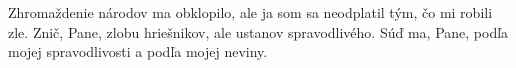 Zhromaždenie národov ma obklopilo, ale ja som sa neodplatil tým, čo mi robili zle.
\versseparator
Znič, Pane, zlobu hriešnikov, ale ustanov spravodlivého.
\versseparator
Súď ma, Pane, podľa mojej spravodlivosti a podľa mojej neviny.